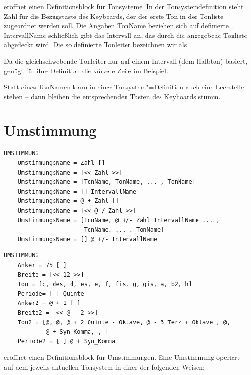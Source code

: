  eröffnet einen Definitionsblock für Tonsysteme.  In der
Tonsystemdefinition steht Zahl für die Bezugstaste des Keyboards, der
der erste Ton in der Tonliste zugeordnet werden soll. Die Angaben
TonName beziehen sich auf definierte .
IntervallName schließlich gibt das Intervall an, das durch die
angegebene Tonliste abgedeckt wird. Die so definierte Tonleiter
bezeichnen wir als
.



Da die gleichschwebende Tonleiter nur auf einem Intervall (dem
Halbton) basiert, genügt für ihre Definition die kürzere Zeile im
Beispiel.


Statt eines TonNamen kann in einer Tonsystem"=Definition auch eine
Leerstelle stehen -- dann bleiben die entsprechenden Tasten des
Keyboards stumm.

\section{Umstimmung}
\label{sec:SX_RETUNING}


\begin{verbatim}
UMSTIMMUNG
    UmstimmungsName = Zahl [] 
    UmstimmungsName = [<< Zahl >>] 
    UmstimmungsName = [TonName, TonName, ... , TonName] 
    UmstimmungsName = [] IntervallName 
    UmstimmungsName = @ + Zahl [] 
    UmstimmungsName = [<< @ / Zahl >>] 
    UmstimmungsName = [TonName, @ +/- Zahl IntervallName ... ,
                       TonName, ... , TonName] 
    UmstimmungsName = [] @ +/- IntervallName
\end{verbatim}




\begin{verbatim}
UMSTIMMUNG
    Anker = 75 [ ] 
    Breite = [<< 12 >>] 
    Ton = [c, des, d, es, e, f, fis, g, gis, a, b2, h] 
    Periode= [ ] Quinte 
    Anker2 = @ + 1 [ ] 
    Breite2 = [<< @ - 2 >>] 
    Ton2 = [@, @, @ + 2 Quinte - Oktave, @ - 3 Terz + Oktave , @, 
            @ + Syn_Komma, , ] 
    Periode2 = [ ] @ + Syn_Komma
\end{verbatim}



 eröffnet einen Definitionsblock für Umstimmungen. 
Eine Umstimmung operiert auf dem jeweils aktuellen Tonsystem 
in einer der folgenden Weisen:

